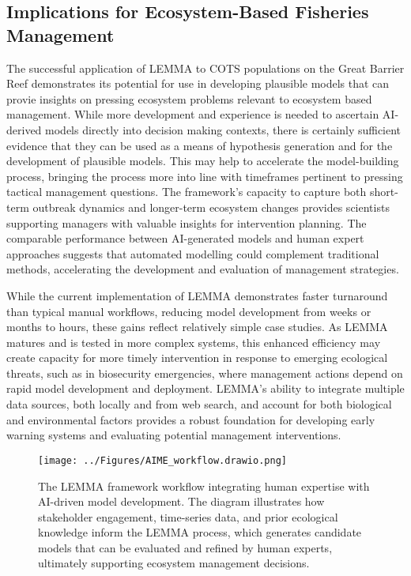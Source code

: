 \subsection{Implications for Ecosystem-Based Fisheries Management}

The successful application of LEMMA to COTS populations on the Great Barrier Reef demonstrates its potential for use in developing plausible models that can provie insights on pressing ecosystem problems relevant to ecosystem based management. While more development and experience is needed to ascertain AI-derived models directly into decision making contexts, there is certainly sufficient evidence that they can be used as a means of
hypothesis generation and for the development of plausible models. This may help to accelerate the model-building process, bringing the process more into line with timeframes pertinent to pressing tactical management questions. The framework's capacity to capture both short-term outbreak dynamics and longer-term ecosystem changes provides scientists supporting managers with valuable insights for intervention planning. The comparable performance between AI-generated models and human expert approaches suggests that automated modelling could complement traditional methods, accelerating the development and evaluation of management strategies.

While the current implementation of LEMMA demonstrates faster turnaround than typical manual workflows, reducing model development from weeks or months to hours, these gains reflect relatively simple case studies. As LEMMA matures and is tested in more complex systems, this enhanced efficiency may create capacity for more timely intervention in response to emerging ecological threats, such as in biosecurity emergencies, where management actions depend on rapid model development and deployment. LEMMA's ability to integrate multiple data sources, both locally and from web search, and account for both biological and environmental factors provides a robust foundation for developing early warning systems and evaluating potential management interventions.\

\begin{figure}[htbp]
    \centering
    \texttt{[image: ../Figures/AIME\_workflow.drawio.png]}
    \caption{The LEMMA framework workflow integrating human expertise with AI-driven model development. The diagram illustrates how stakeholder engagement, time-series data, and prior ecological knowledge inform the LEMMA process, which generates candidate models that can be evaluated and refined by human experts, ultimately supporting ecosystem management decisions.}
    \label{fig:aime_workflow}
\end{figure}


